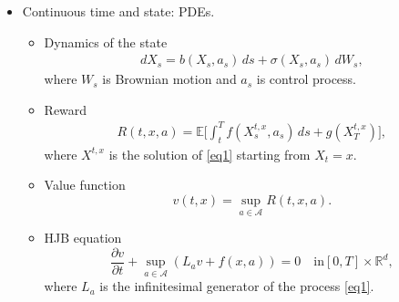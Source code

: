 \documentclass{beamer}
\begin{document}
\begin{frame}
\begin{itemize}
\item Continuous time and state: PDEs. 
\begin{itemize}
\item Dynamics of the state
\begin{align}\label{eq1}
dX_s = b(X_s,a_s)\,ds + \sigma(X_s,a_s)\,dW_s,
\end{align}
where $W_s$ is Brownian motion and $a_s$ is control process.
\pause
\item Reward 
\begin{align*}
R(t,x,a) = \mathbb{E}\big[\int_t^Tf(X_s^{t,x},a_s)\,ds + g(X_T^{t,x})\big],
\end{align*}
where $X^{t,x}$ is the solution of \eqref{eq1} starting from $X_t = x$.
\pause
\item Value function 
$$v(t,x) = \sup_{a\in \mathcal{A}}R(t,x,a).$$
\pause
\item HJB equation 
$$\frac{\partial v}{\partial t} + \sup_{a\in \mathcal{A}}(L_a v + f(x,a)) = 0\quad \text{in} [0,T]\times \mathbb{R}^d,$$
where $L_a$ is the infinitesimal generator of the process \eqref{eq1}. 
\end{itemize}
\end{itemize}

\end{frame}
\end{document}
